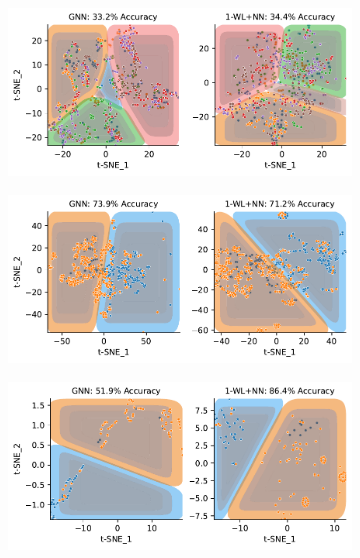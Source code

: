 \begin{figure}[htb]
	\begin{subfigure}[b]{0.49\textwidth}
		\centering
		\includegraphics[width=\textwidth]{Figures/tsne_svm_lin_ENZYMES.pdf}
		\vspace*{-4ex} 
		\caption{\enzymes}
	\end{subfigure}
	\hfill
	\begin{subfigure}[b]{0.49\textwidth}
		\centering
		\includegraphics[width=\textwidth]{Figures/tsne_svm_lin_IMDB.pdf}
		\vspace*{-4ex} 
		\caption{\imdb}
	\end{subfigure}
	\par\bigskip
	\begin{subfigure}[b]{0.49\textwidth}
		\centering
		\includegraphics[width=\textwidth]{Figures/tsne_svm_lin_MUTAG.pdf}

\end{subfigure}
\end{figure}
